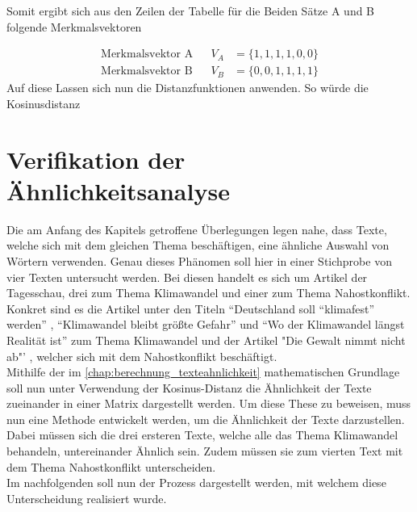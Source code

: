 Somit ergibt sich aus den Zeilen der Tabelle für die Beiden Sätze A und B folgende Merkmalsvektoren

\begin{equation}
	\begin{aligned} 
		\text{Merkmalsvektor A}&& V_{A}&=\{1,1,1,1,0,0\}  \\
		\text{Merkmalsvektor B}&& V_{B}&=\{0,0,1,1,1,1\}
	\end{aligned} 
\label{eq:merkmalsvektoren}
\end{equation}
Auf diese Lassen sich nun die Distanzfunktionen anwenden. So würde die Kosinusdistanz 

\section{Verifikation der Ähnlichkeitsanalyse}
Die am Anfang des Kapitels getroffene Überlegungen legen nahe, dass Texte, welche sich mit dem gleichen Thema beschäftigen, eine ähnliche Auswahl von Wörtern verwenden. Genau dieses Phänomen soll hier in einer Stichprobe von vier Texten untersucht werden. Bei diesen handelt es sich um Artikel der Tagesschau, drei zum Thema Klimawandel und einer zum Thema Nahostkonflikt. Konkret sind es die Artikel unter den Titeln "`Deutschland soll "`klimafest"' werden"' , "`Klimawandel bleibt größte Gefahr"'  und "`Wo der Klimawandel längst Realität ist"'  zum Thema Klimawandel und der Artikel "Die Gewalt nimmt nicht ab"' , welcher sich mit dem Nahostkonflikt beschäftigt. \\ \newline
Mithilfe der im \autoref{chap:berechnung_texteahnlichkeit} mathematischen Grundlage soll nun unter Verwendung der Kosinus-Distanz die Ähnlichkeit der Texte zueinander in einer Matrix dargestellt werden. Um diese These zu beweisen, muss nun eine Methode entwickelt werden, um die Ähnlichkeit der Texte darzustellen. Dabei müssen sich die drei ersteren Texte, welche alle das Thema Klimawandel behandeln, untereinander Ähnlich sein. Zudem müssen sie zum vierten Text mit dem Thema Nahostkonflikt unterscheiden. \\ \newline
Im nachfolgenden soll nun der Prozess dargestellt werden, mit welchem diese Unterscheidung realisiert wurde.
